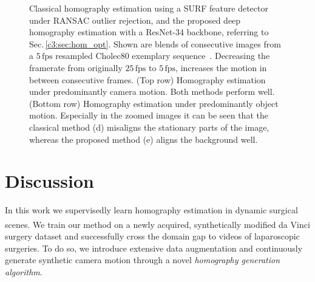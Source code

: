\begin{figure}[tb]
    \caption{Classical homography estimation using a SURF feature detector under RANSAC outlier rejection, and the proposed deep homography estimation with a ResNet-34 backbone, referring to Sec.\,\ref{c3:sec:hom_opt}. Shown are blends of consecutive images from a $5\,\text{fps}$ resampled Cholec80 exemplary sequence~\cite{twinanda2016endonet}. Decreasing the framerate from originally $25\,\text{fps}$ to $5\,\text{fps}$, increases the motion in between consecutive frames. (Top row) Homography estimation under predominantly camera motion. Both methods perform well. (Bottom row) Homography estimation under predominantly object motion. Especially in the zoomed images it can be seen that the classical method (d) misaligns the stationary parts of the image, whereas the proposed method (e) aligns the background well.}
    \label{c3:fig:qualitative}
\end{figure}



\section{Discussion}

In this work we supervisedly learn homography estimation in dynamic surgical scenes. We train our method on a newly acquired, synthetically modified da Vinci\textsuperscript{\textregistered} surgery dataset and successfully cross the domain gap to videos of laparoscopic surgeries. To do so, we introduce extensive data augmentation and continuously generate synthetic camera motion through a novel \textit{homography generation algorithm}.

